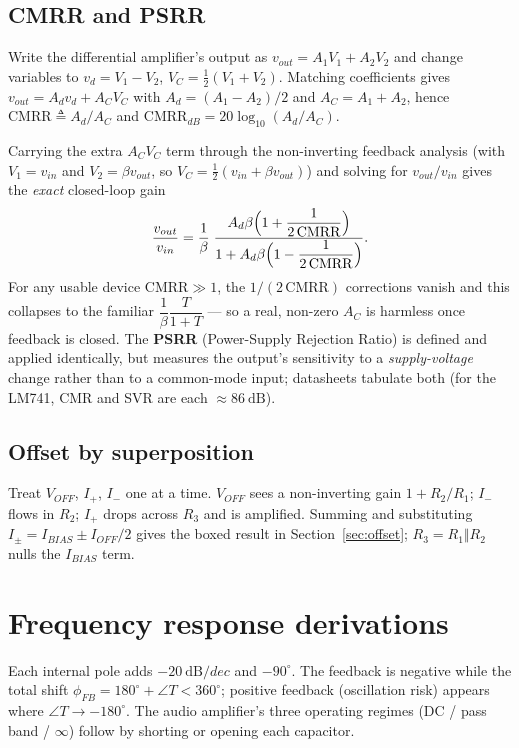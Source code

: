\documentclass[11pt,a4paper,oneside]{book}
\newcommand{\vd}{v_d}
\newcommand{\Ad}{A_d}
\begin{document}
\section{CMRR and PSRR}\label{app:cmrr}
Write the differential amplifier's output as $v_{out}=A_1V_1+A_2V_2$ and change
variables to $\vd=V_1-V_2$, $V_C=\tfrac12(V_1+V_2)$. Matching coefficients gives
$v_{out}=\Ad\vd+A_CV_C$ with $\Ad=(A_1-A_2)/2$ and $A_C=A_1+A_2$, hence
$\text{CMRR}\triangleq\Ad/A_C$ and $\text{CMRR}_{dB}=20\log_{10}(\Ad/A_C)$.

Carrying the extra $A_CV_C$ term through the non-inverting feedback analysis (with
$V_1=v_{in}$ and $V_2=\beta v_{out}$, so $V_C=\tfrac12(v_{in}+\beta v_{out})$) and
solving for $v_{out}/v_{in}$ gives the \emph{exact} closed-loop gain
\[
 \frac{v_{out}}{v_{in}}
   =\frac1\beta\;
    \frac{\Ad\beta\Bigl(1+\dfrac{1}{2\,\text{CMRR}}\Bigr)}
         {1+\Ad\beta\Bigl(1-\dfrac{1}{2\,\text{CMRR}}\Bigr)} .
\]
For any usable device $\text{CMRR}\gg1$, the $1/(2\,\text{CMRR})$ corrections vanish
and this collapses to the familiar $\dfrac1\beta\dfrac{T}{1+T}$ --- so a real,
non-zero $A_C$ is harmless once feedback is closed. The \textbf{PSRR}
(Power-Supply Rejection Ratio) is defined and applied identically, but measures the
output's sensitivity to a \emph{supply-voltage} change rather than to a common-mode
input; datasheets tabulate both (for the LM741, CMR and SVR are each
$\approx\qty{86}{\dB}$).

\section{Offset by superposition}\label{app:offset}
Treat $V_{\!OFF}$, $I_+$, $I_-$ one at a time. $V_{\!OFF}$ sees a non-inverting
gain $1+R_2/R_1$; $I_-$ flows in $R_2$; $I_+$ drops across $R_3$ and is amplified.
Summing and substituting $I_\pm=I_{BIAS}\pm I_{\!OFF}/2$ gives the boxed result in
Section~\ref{sec:offset}; $R_3=R_1\Vert R_2$ nulls the $I_{BIAS}$ term.

\chapter{Frequency response derivations}\label{app:freqresp}
Each internal pole adds $-\qty{20}{\dB\per dec}$ and $-90^\circ$. The feedback is
negative while the total shift $\phi_{FB}=180^\circ+\angle T<360^\circ$; positive
feedback (oscillation risk) appears where $\angle T\to-180^\circ$. The audio
amplifier's three operating regimes (DC / pass band / $\infty$) follow by shorting
or opening each capacitor.
\end{document}
